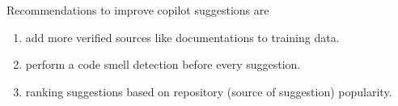 Recommendations to improve copilot suggestions are
\begin{enumerate}
    \item add more verified sources like documentations to training data.
    \item perform a code smell detection before every suggestion.
    \item ranking suggestions based on repository (source of suggestion) popularity.
\end{enumerate}



